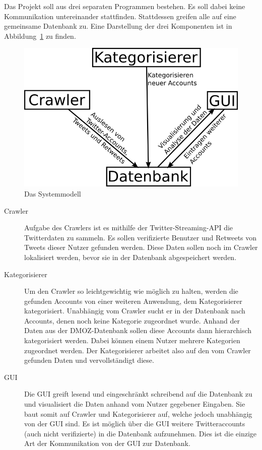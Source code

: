 
Das Projekt soll aus drei separaten Programmen bestehen. Es soll dabei keine Kommunikation untereinander stattfinden. Stattdessen greifen alle auf eine gemeinsame Datenbank zu. Eine Darstellung der drei Komponenten ist in Abbildung~\ref{c:systemmodell} zu finden.

\begin{figure}[h]
	\centering
	\includegraphics[scale=2]{img/Systemmodell.png}
	\caption{Das Systemmodell}
	\label{c:systemmodell}
\end{figure}

\begin{description}
	\item[Crawler] Aufgabe des Crawlers ist es mithilfe der Twitter-Streaming-API die Twitterdaten zu sammeln. Es sollen verifizierte Benutzer und Retweets von Tweets dieser Nutzer gefunden werden. Diese Daten sollen noch im Crawler lokalisiert werden, bevor sie in der Datenbank abgespeichert werden.
	\item[Kategorisierer] Um den Crawler so leichtgewichtig wie möglich zu halten, werden die gefunden Accounts von einer weiteren Anwendung, dem Kategorisierer kategorisiert. Unabhängig vom Crawler sucht er in der Datenbank nach Accounts, denen noch keine Kategorie zugeordnet wurde. Anhand der Daten aus der DMOZ-Datenbank sollen diese Accounts dann hierarchisch kategorisiert werden. Dabei können einem Nutzer mehrere Kategorien zugeordnet werden. Der Kategorisierer arbeitet also auf den vom Crawler gefunden Daten und vervollständigt diese.
	\item[GUI] Die GUI greift lesend und eingeschränkt schreibend auf die Datenbank zu und visualisiert die Daten anhand vom Nutzer gegebener Eingaben. Sie baut somit auf Crawler und Kategorisierer auf, welche jedoch unabhängig von der GUI sind. Es ist möglich über die GUI weitere Twitteraccounts (auch nicht verifizierte) in die Datenbank aufzunehmen. Dies ist die einzige Art der Kommunikation von der GUI zur Datenbank.
\end{description}


